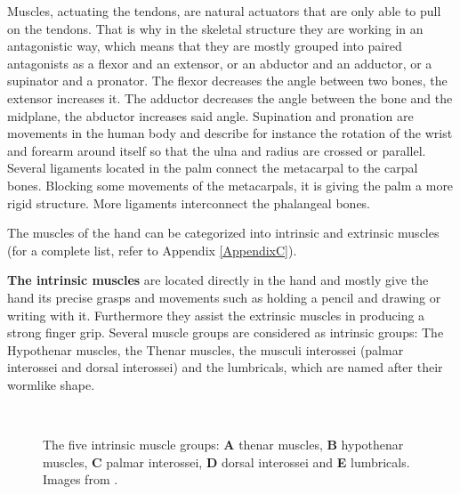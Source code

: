 \documentclass[main]{subfiles}
\begin{document}
Muscles, actuating the tendons, are natural actuators that are only able to pull on the tendons. That is why in the skeletal structure they are working in an antagonistic way, which means that they are mostly grouped into paired antagonists as a flexor and an extensor, or an abductor and an adductor, or a supinator and a pronator. The flexor decreases the angle between two bones, the extensor increases it. The adductor decreases the angle between the bone and the midplane, the abductor increases said angle. Supination and pronation are movements in the human body and describe for instance the rotation of the wrist and forearm around itself so that the ulna and radius are crossed or parallel.
Several ligaments located in the palm connect the metacarpal to the carpal bones. Blocking some movements of the metacarpals, it is giving the palm a more rigid structure. More ligaments interconnect the phalangeal bones.

The muscles of the hand can be categorized into intrinsic and extrinsic muscles (for a complete list, refer to Appendix \ref{AppendixC}).

\textbf{The intrinsic muscles} are located directly in the hand and mostly give the hand its precise grasps and movements such as holding a pencil and drawing or writing with it. Furthermore they assist the extrinsic muscles in producing a strong finger grip. Several muscle groups are considered as intrinsic groups: The Hypothenar muscles, the Thenar muscles, the musculi interossei (palmar interossei and dorsal interossei) and the lumbricals, which are named after their wormlike shape. 

\begin{figure}[H]
\centering
{}\hspace{0.15\textwidth}
\hspace{0.15\textwidth}
\\
\hspace{0.15\textwidth}
\caption[The five intrinsic muscle groups of the human hand]{The five intrinsic muscle groups: \textbf{A} thenar muscles, \textbf{B} hypothenar
muscles, \textbf{C} palmar interossei, \textbf{D} dorsal interossei and \textbf{E} lumbricals. Images from \cite{Reynolds2004}.}
\label{intrinsic-muscles}
\end{figure}
\end{document}
